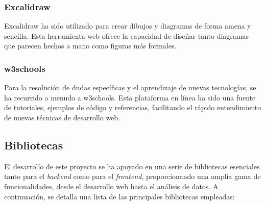 \subsubsection{Excalidraw}
Excalidraw ha sido utilizado para crear dibujos y diagramas de forma amena y sencilla. Esta herramienta web ofrece la capacidad de diseñar tanto diagramas que parecen hechos a mano como figuras más formales.

\subsubsection{w3schools}
Para la resolución de dudas específicas y el aprendizaje de nuevas tecnologías, se ha recurrido a menudo a w3schools. Esta plataforma en línea ha sido una fuente de tutoriales, ejemplos de código y referencias, facilitando el rápido entendimiento de nuevas técnicas de desarrollo web.


\subsection{Bibliotecas}
El desarrollo de este proyecto se ha apoyado en una serie de bibliotecas esenciales tanto para el \textit{backend} como para el \textit{frontend}, proporcionando una amplia gama de funcionalidades, desde el desarrollo web hasta el análisis de datos. A continuación, se detalla una lista de las principales bibliotecas empleadas:


